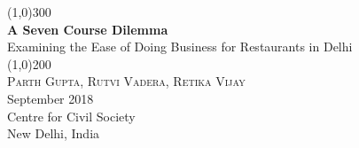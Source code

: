 \documentclass[a4paper, 12pt]{article}
\begin{document}
                    
                    \begin{titlepage}
                    	\begin{center}
                    	\line(1,0){300}\\
                    	[0.25in]
                    	\huge{\bfseries \textcolor{CCSbrown} {A Seven Course Dilemma}} \\
    	[0.5cm]
    	\large  {Examining the Ease of Doing Business for Restaurants in Delhi} \\%
    	
                    	\line(1,0){200}\\
                    	[1in]
                    	\textsc{\huge Parth Gupta, Rutvi Vadera, Retika Vijay} \\ %
                    	[1.5cm]
                    	{\Large September 2018} \\
                    	[2.0cm]
                    	{\LARGE Centre for Civil Society} \\
                    	[0.1mm]
                    	{\Large New Delhi, India} \\
    	[2.0cm]
      
                    	\end{center}
                    \end{titlepage}
                    
                    \tableofcontents
                    
                   \newpage
                   
\end{document}
